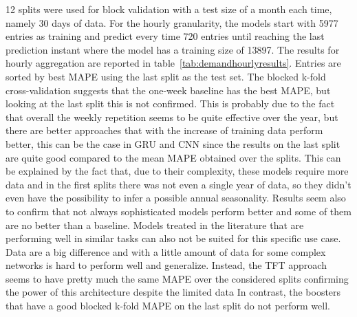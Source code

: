 12 splits were used for block validation with a test size of a month each time, namely 30 days of data.
For the hourly granularity, the models start with 5977 entries as training and predict every time 720 entries until reaching the last prediction instant where the model has a training size of 13897.
The results for hourly aggregation are reported in table~\ref{tab:demandhourlyresults}.
Entries are sorted by best MAPE using the last split as the test set.
The blocked k-fold cross-validation suggests that the one-week baseline has the best MAPE, but looking at the last split this is not confirmed.
This is probably due to the fact that overall the weekly repetition seems to be quite effective over the year, but there are better approaches that with the increase of training data perform better, this can be the case in GRU and CNN since the results on the last split are quite good compared to the mean MAPE obtained over the splits.
This can be explained by the fact that, due to their complexity, these models require more data and in the first splits there was not even a single year of data, so they didn't even have the possibility to infer a possible annual seasonality.
Results seem also to confirm that not always sophisticated models perform better and some of them are no better than a baseline.
Models treated in the literature that are performing well in similar tasks can also not be suited for this specific use case.
Data are a big difference and with a little amount of data for some complex networks is hard to perform well and generalize.
Instead, the TFT approach seems to have pretty much the same MAPE over the considered splits confirming the power of this architecture despite the limited data
In contrast, the boosters that have a good blocked k-fold MAPE on the last split do not perform well.

